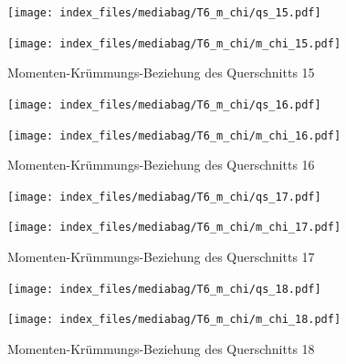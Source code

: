 \documentclass[
  11pt,
  letterpaper,
]{scrreprt}
\begin{document}
\begin{figure}[H]

\begin{minipage}{0.50\linewidth}
\texttt{[image: index\_files/mediabag/T6\_m\_chi/qs\_15.pdf]}\end{minipage}%
%
\begin{minipage}{0.50\linewidth}
\texttt{[image: index\_files/mediabag/T6\_m\_chi/m\_chi\_15.pdf]}\end{minipage}%

\caption{\label{fig-mchi_anhang}Momenten-Krümmungs-Beziehung des
Querschnitts 15}

\end{figure}%

\begin{figure}[H]

\begin{minipage}{0.50\linewidth}
\texttt{[image: index\_files/mediabag/T6\_m\_chi/qs\_16.pdf]}\end{minipage}%
%
\begin{minipage}{0.50\linewidth}
\texttt{[image: index\_files/mediabag/T6\_m\_chi/m\_chi\_16.pdf]}\end{minipage}%

\caption{\label{fig-mchi_anhang}Momenten-Krümmungs-Beziehung des
Querschnitts 16}

\end{figure}%

\begin{figure}[H]

\begin{minipage}{0.50\linewidth}
\texttt{[image: index\_files/mediabag/T6\_m\_chi/qs\_17.pdf]}\end{minipage}%
%
\begin{minipage}{0.50\linewidth}
\texttt{[image: index\_files/mediabag/T6\_m\_chi/m\_chi\_17.pdf]}\end{minipage}%

\caption{\label{fig-mchi_anhang}Momenten-Krümmungs-Beziehung des
Querschnitts 17}

\end{figure}%

\begin{figure}[H]

\begin{minipage}{0.50\linewidth}
\texttt{[image: index\_files/mediabag/T6\_m\_chi/qs\_18.pdf]}\end{minipage}%
%
\begin{minipage}{0.50\linewidth}
\texttt{[image: index\_files/mediabag/T6\_m\_chi/m\_chi\_18.pdf]}\end{minipage}%

\caption{\label{fig-mchi_anhang}Momenten-Krümmungs-Beziehung des
Querschnitts 18}

\end{figure}%
\end{document}

